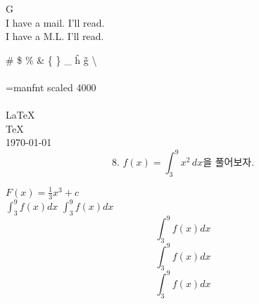 \documentclass[fleqn]{article}
\begin{document}
G \\
I have a mail. I'll read.\\
I have a M.L. I'll read.

\# \$ \% \& \textbackslash@ \{ \} \_ \^{h} \~{g} \textbackslash \\ \\

\font\myfont=manfnt scaled 4000
{\myfont{}   } \\
{\myfont{}  }
\\\LaTeX
\\\TeX
\\ \today
\newpage
\begin{displaymath}
\text{8. }f(x) = \int_{3}^{9} x^2 \, dx \text{을 풀어보자.}
\end{displaymath}


\begin{math}
F(x) = \frac{1}{3}x^3 + c
\end{math}
\\
$\int_{3}^{9} f(x)dx$
\(\int_{3}^{9} f(x)dx\)\\
\begin{displaymath}
    \int_{3}^{9} f(x)dx 
\end{displaymath}
$$\int_{3}^{9} f(x)dx$$
\[\int_{3}^{9} f(x)dx\]
    
\end{document}
